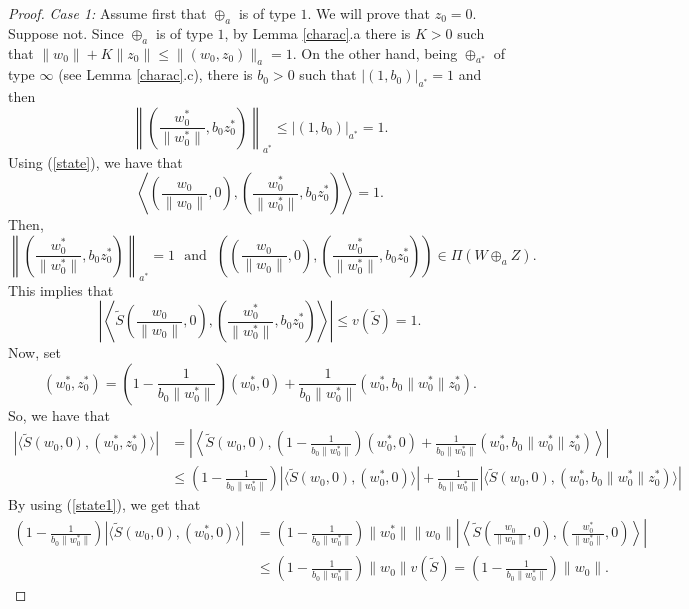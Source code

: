 \documentclass[10pt,a4paper]{amsart}
\theoremstyle{plain}
\theoremstyle{definition}
\renewcommand{\leq}{\leqslant}
\begin{document}
\begin{proof}
\noindent
{\it Case 1:} Assume first that $\oplus_a$ is of type $1$. We will prove that $z_0 = 0$. Suppose not. Since $\oplus_a$ is of type $1$, by Lemma \ref{charac}.a there is $K > 0$ such that $\|w_0\| + K\|z_0\| \leq \|(w_0, z_0)\|_a = 1$. On the other hand, being $\oplus_{a^*}$ of type $\infty$ (see Lemma \ref{charac}.c), there is $b_0 > 0$ such that $|(1, b_0)|_{a^*} = 1$ and then
\begin{equation*}
\left\| \left( \frac{w_0^*}{\|w_0^*\|}, b_0 z_0^* \right) \right\|_{a^*} \leq |(1, b_0)|_{a^*} = 1.
\end{equation*}
Using (\ref{state}), we have that
\begin{equation*}
\left \langle \left( \frac{w_0}{\|w_0\|}, 0 \right), \left( \frac{w_0^*}{\|w_0^*\|}, b_0 z_0^* \right) \right \rangle = 1.
\end{equation*}
Then,
\begin{equation*}
\left\| \left( \frac{w_0^*}{\|w_0^*\|}, b_0 z_0^* \right) \right\|_{a^*} = 1 \ \ \ \mbox{and} \ \ \ \left(\left( \frac{w_0}{\|w_0\|}, 0 \right), \left( \frac{w_0^*}{\|w_0^*\|}, b_0 z_0^* \right)\right) \in \Pi(W \oplus_a Z).
\end{equation*}
This implies that
\begin{equation} \label{NRAineq}
	\left| \left \langle \widetilde{S} \left( \frac{w_0}{\|w_0\|}, 0 \right), \left( \frac{w_0^*}{\|w_0^*\|}, b_0 z_0^* \right) \right \rangle \right| \leq v(\widetilde{S}) = 1.
\end{equation}
Now, set
\begin{equation*}
(w_0^*, z_0^*) = \left(1 - \frac{1}{b_0\|w_0^*\|} \right)(w_0^*, 0) + \frac{1}{b_0 \|w_0^*\|} (w_0^*, b_0 \|w_0^*\| z_0^*).	
\end{equation*}
So, we have that
\begin{align*}
|\langle \widetilde{S}(w_0, 0), (w_0^*, z_0^*) \rangle| &= \left| \left \langle \widetilde{S}(w_0, 0), \left( 1 - \frac{1}{b_0 \|w_0^*\|} \right) (w_0^*, 0) + \frac{1}{b_0 \|w_0^*\|} (w_0^*, b_0 \|w_0^*\| z_0^*) \right \rangle \right| \\
&\leq \left(1 - \frac{1}{b_0 \|w_0^*\|} \right) |\langle \widetilde{S}(w_0, 0), (w_0^*, 0) \rangle| + \frac{1}{b_0 \|w_0^*\|} |\langle \widetilde{S}(w_0, 0), (w_0^*, b_0 \|w_0^*\| z_0^*) \rangle|
\end{align*}
By using (\ref{state1}), we get that
\begin{align*}
\left(1 - \frac{1}{b_0 \|w_0^*\|} \right) | \langle \widetilde{S}(w_0, 0), (w_0^*, 0) \rangle| &= \left(1 - \frac{1}{b_0 \|w_0^*\|} \right) \|w_0^*\| \|w_0\| \left| \left \langle \widetilde{S} \left( \frac{w_0}{\|w_0\|}, 0 \right), \left( \frac{w_0^*}{\|w_0^*\|}, 0 \right) \right \rangle \right| \\ &\leq \left(1 - \frac{1}{b_0 \|w_0^*\|}\right) \|w_0\| v(\widetilde{S}) = \left(1 - \frac{1}{b_0 \|w_0^*\|}\right) \|w_0\|.

\end{align*}
\end{proof}
\end{document}

